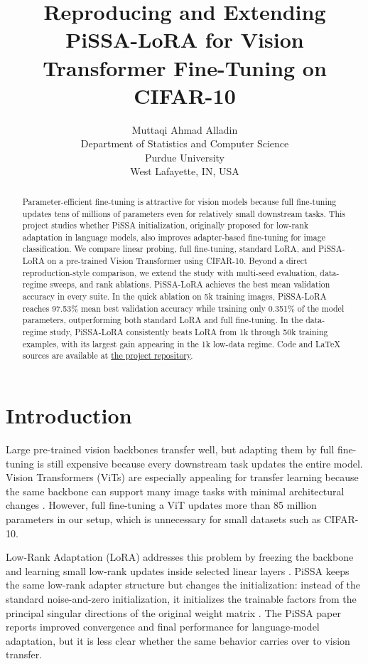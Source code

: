 \documentclass{article}
\title{Reproducing and Extending PiSSA-LoRA for Vision Transformer Fine-Tuning on CIFAR-10}
\author{
Muttaqi Ahmad Alladin \\
Department of Statistics and Computer Science \\
Purdue University \\
West Lafayette, IN, USA
}
\begin{document}
\maketitle

\begin{abstract}
Parameter-efficient fine-tuning is attractive for vision models because full fine-tuning updates tens of millions of parameters even for relatively small downstream tasks. This project studies whether PiSSA initialization, originally proposed for low-rank adaptation in language models, also improves adapter-based fine-tuning for image classification. We compare linear probing, full fine-tuning, standard LoRA, and PiSSA-LoRA on a pre-trained Vision Transformer using CIFAR-10. Beyond a direct reproduction-style comparison, we extend the study with multi-seed evaluation, data-regime sweeps, and rank ablations. PiSSA-LoRA achieves the best mean validation accuracy in every suite. In the quick ablation on 5k training images, PiSSA-LoRA reaches 97.53\% mean best validation accuracy while training only 0.351\% of the model parameters, outperforming both standard LoRA and full fine-tuning. In the data-regime study, PiSSA-LoRA consistently beats LoRA from 1k through 50k training examples, with its largest gain appearing in the 1k low-data regime. Code and \LaTeX{} sources are available at \href{https://github.com/muttaqiahmadalladin/ECE5700/tree/main}{the project repository}.
\end{abstract}

\section{Introduction}

Large pre-trained vision backbones transfer well, but adapting them by full fine-tuning is still expensive because every downstream task updates the entire model. Vision Transformers (ViTs) are especially appealing for transfer learning because the same backbone can support many image tasks with minimal architectural changes \citep{dosovitskiy2021vit}. However, full fine-tuning a ViT updates more than 85 million parameters in our setup, which is unnecessary for small datasets such as CIFAR-10.

Low-Rank Adaptation (LoRA) addresses this problem by freezing the backbone and learning small low-rank updates inside selected linear layers \citep{hu2021lora}. PiSSA keeps the same low-rank adapter structure but changes the initialization: instead of the standard noise-and-zero initialization, it initializes the trainable factors from the principal singular directions of the original weight matrix \citep{meng2024pissa}. The PiSSA paper reports improved convergence and final performance for language-model adaptation, but it is less clear whether the same behavior carries over to vision transfer.
\end{document}
